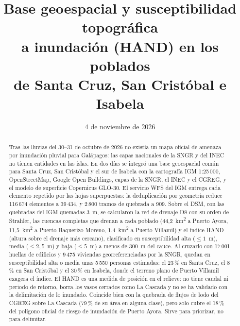 \documentclass{sosg-informe}
\title{Base geoespacial y susceptibilidad topográfica\\a inundación (HAND) en los poblados\\de Santa Cruz, San Cristóbal e Isabela}
\date{4 de noviembre de 2026}
\newcommand{\kmc}{km\textsuperscript{2}}
\begin{document}
\maketitle

\begin{abstract}
Tras las lluvias del 30--31 de octubre de 2026 no existía un mapa oficial de amenaza por inundación pluvial para Galápagos: las capas nacionales de la SNGR y del INEC no tienen entidades en las islas. En dos días se integró una base geoespacial común para Santa Cruz, San Cristóbal y el sur de Isabela con la cartografía IGM 1:25\,000, OpenStreetMap, Google Open Buildings, capas de la SNGR, el INEC y el CGREG, y el modelo de superficie Copernicus GLO-30. El servicio WFS del IGM entrega cada elemento repetido por las hojas superpuestas: la deduplicación por geometría reduce 116\,674 elementos a 39\,434, y 2\,800 tramos de quebrada a 909. Sobre el DSM, con las quebradas del IGM quemadas 3~m, se calcularon la red de drenaje D8 con su orden de Strahler, las cuencas completas que drenan a cada poblado (44,2~\kmc{} a Puerto Ayora, 11,5~\kmc{} a Puerto Baquerizo Moreno, 1,4~\kmc{} a Puerto Villamil) y el índice HAND (altura sobre el drenaje más cercano), clasificado en susceptibilidad alta ($\leq 1$~m), media ($\leq 2{,}5$~m) y baja ($\leq 5$~m) a menos de 300~m del cauce. Al cruzarlo con 17\,001 huellas de edificios y 9\,475 viviendas georreferenciadas por la SNGR, quedan en susceptibilidad alta o media unas 5\,550 personas estimadas: el 23\,\% en Santa Cruz, el 8\,\% en San Cristóbal y el 30\,\% en Isabela, donde el terreno plano de Puerto Villamil exagera el índice. El HAND es una medida de posición en el relieve: no tiene caudal ni periodo de retorno, borra los vasos cerrados como La Cascada y no se ha validado con la delimitación de lo inundado. Coincide bien con la quebrada de flujos de lodo del CGREG sobre La Cascada (79\,\% de su área en alguna clase), pero solo cubre el 18\,\% del polígono oficial de riesgo de inundación de Puerto Ayora. Sirve para priorizar, no para delimitar.
\end{abstract}
\end{document}
